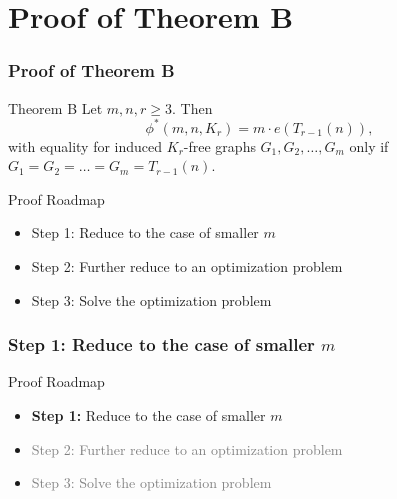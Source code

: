 \documentclass{beamer}
\begin{document}
\section{Proof of Theorem B}

\begin{frame}
  \frametitle{Proof of Theorem B}

  \begin{block}{Theorem B}
    Let $m, n, r \geq 3$. Then 
    \[
      \phi^*(m,n,K_{r}) = m \cdot e(T_{r - 1}(n)),
    \]
    with equality for induced $K_{r}$-free graphs $G_1, G_2, \dots, G_m$ only if $G_1 = G_2 = \dots = G_m = T_{r - 1}(n)$.  
  \end{block}

  \vspace{0.3cm}

  Proof Roadmap

  \begin{itemize}
    \item Step 1: Reduce to the case of smaller $m$
    \item Step 2: Further reduce to an optimization problem
    \item Step 3: Solve the optimization problem
  \end{itemize}
\end{frame}

\begin{frame}
  \frametitle{Step 1: Reduce to the case of smaller $m$}

  Proof Roadmap

  \begin{itemize}
    \item \textbf{Step 1:} Reduce to the case of smaller $m$
    \item \textcolor{gray}{Step 2: Further reduce to an optimization problem}
    \item \textcolor{gray}{Step 3: Solve the optimization problem}
  \end{itemize}
\end{frame}



\end{document}
